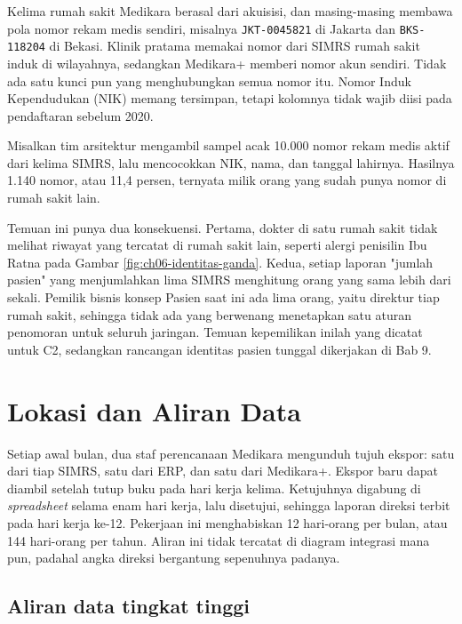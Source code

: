 \begin{kasus}[title={Kasus Medikara Health: Lima Pola Nomor Rekam Medis}]
  Kelima rumah sakit Medikara berasal dari akuisisi, dan masing-masing membawa
  pola nomor rekam medis sendiri, misalnya \texttt{JKT-0045821} di Jakarta dan
  \texttt{BKS-118204} di Bekasi. Klinik pratama memakai nomor dari SIMRS rumah
  sakit induk di wilayahnya, sedangkan Medikara+ memberi nomor akun sendiri.
  Tidak ada satu kunci pun yang menghubungkan semua nomor itu. Nomor Induk
  Kependudukan (NIK) memang tersimpan, tetapi kolomnya tidak wajib diisi pada
  pendaftaran sebelum 2020.

  Misalkan tim arsitektur mengambil sampel acak 10.000 nomor rekam medis aktif
  dari kelima SIMRS, lalu mencocokkan NIK, nama, dan tanggal lahirnya.
  Hasilnya 1.140 nomor, atau 11,4 persen, ternyata milik orang yang sudah
  punya nomor di rumah sakit lain.

  Temuan ini punya dua konsekuensi. Pertama, dokter di satu rumah sakit tidak
  melihat riwayat yang tercatat di rumah sakit lain, seperti alergi penisilin
  Ibu Ratna pada Gambar \ref{fig:ch06-identitas-ganda}. Kedua, setiap laporan
  "jumlah pasien" yang menjumlahkan lima SIMRS menghitung orang yang sama lebih
  dari sekali. Pemilik bisnis konsep Pasien saat ini ada lima orang, yaitu
  direktur tiap rumah sakit, sehingga tidak ada yang berwenang menetapkan satu
  aturan penomoran untuk seluruh jaringan. Temuan kepemilikan inilah yang
  dicatat untuk C2, sedangkan rancangan identitas pasien tunggal dikerjakan di
  Bab 9.
\end{kasus}

\section{Lokasi dan Aliran Data}

Setiap awal bulan, dua staf perencanaan Medikara mengunduh tujuh ekspor: satu
dari tiap SIMRS, satu dari ERP, dan satu dari Medikara+. Ekspor baru dapat
diambil setelah tutup buku pada hari kerja kelima. Ketujuhnya digabung di
\textit{spreadsheet} selama enam hari kerja, lalu disetujui, sehingga laporan
direksi terbit pada hari kerja ke-12. Pekerjaan ini menghabiskan 12 hari-orang
per bulan, atau 144 hari-orang per tahun. Aliran ini tidak tercatat di diagram
integrasi mana pun, padahal angka direksi bergantung sepenuhnya padanya.

\subsection*{Aliran data tingkat tinggi}

